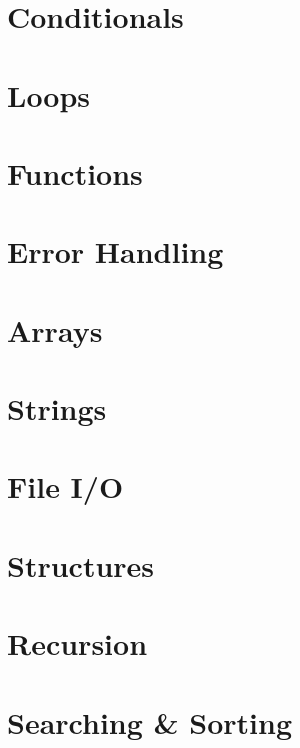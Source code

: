 \documentclass[12pt]{scrbook}
\begin{document}
\chapter{Conditionals}


\chapter{Loops}


\chapter{Functions}
\label{chapter:c:functions}


\chapter{Error Handling}
\label{chapter:c:errorHandling}


\chapter{Arrays}
\label{chapter:c:arrays}


\chapter{Strings}
\label{chapter:c:strings}


\chapter{File I/O}
\label{chapter:c:fileIO}


\chapter{Structures}
\label{chapter:c:structs}


\chapter{Recursion}
\label{chapter:c:recursion}


\chapter{Searching \& Sorting}
\label{chapter:c:searchingSorting}

\end{document}
